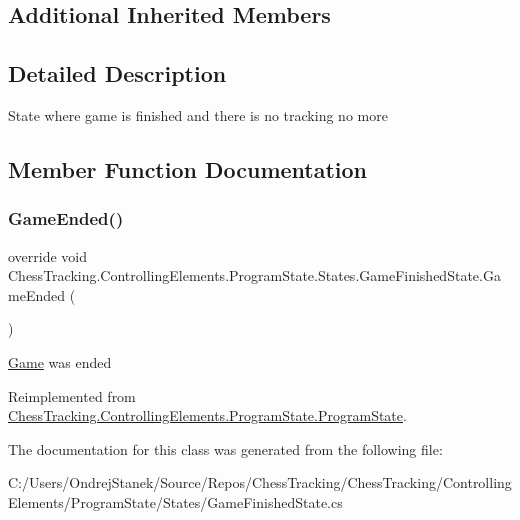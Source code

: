\subsection*{Additional Inherited Members}


\subsection{Detailed Description}
State where game is finished and there is no tracking no more 



\subsection{Member Function Documentation}
\mbox{\label{class_chess_tracking_1_1_controlling_elements_1_1_program_state_1_1_states_1_1_game_finished_state_a13eabd72515fdbb1fc9b0026ff7800a7}} 
\subsubsection{\texorpdfstring{GameEnded()}{GameEnded()}}
{\footnotesize\ttfamily override void Chess\+Tracking.\+Controlling\+Elements.\+Program\+State.\+States.\+Game\+Finished\+State.\+Game\+Ended (\begin{DoxyParamCaption}{ }\end{DoxyParamCaption})\hspace{0.3cm}{\ttfamily [virtual]}}



\mbox{\hyperlink{namespace_chess_tracking_1_1_game}{Game}} was ended 



Reimplemented from \mbox{\hyperlink{class_chess_tracking_1_1_controlling_elements_1_1_program_state_1_1_program_state_a7ff7676272d3449e524a11eb73201e30}{Chess\+Tracking.\+Controlling\+Elements.\+Program\+State.\+Program\+State}}.



The documentation for this class was generated from the following file\+:\begin{DoxyCompactItemize}
\item 
C\+:/\+Users/\+Ondrej\+Stanek/\+Source/\+Repos/\+Chess\+Tracking/\+Chess\+Tracking/\+Controlling\+Elements/\+Program\+State/\+States/Game\+Finished\+State.\+cs\end{DoxyCompactItemize}
